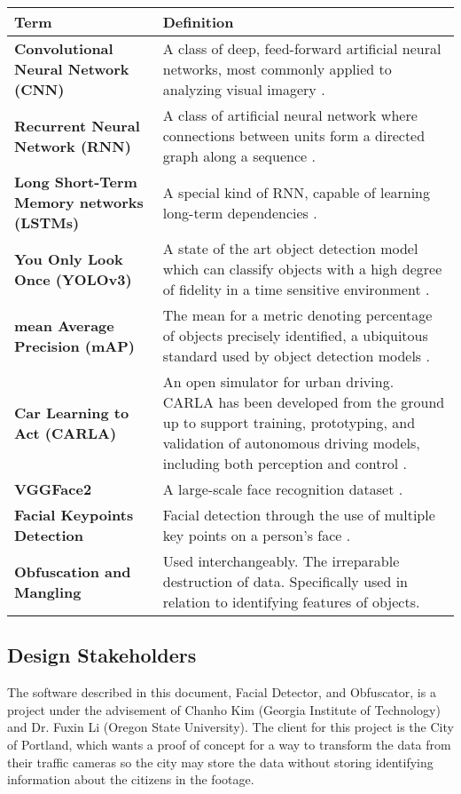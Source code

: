\begin{center}
  \begin{tabular}{ | l | p{10cm} | } 
    \hline \textbf{Term} & \textbf{Definition} \\ \hline
    \textbf{Convolutional Neural Network (CNN)} & A class of deep, feed-forward artificial neural networks, most commonly applied to analyzing visual imagery \cite{CNN}. \\ \hline
    \textbf{Recurrent Neural Network (RNN)} & A class of artificial neural network where connections between units form a directed graph along a sequence \cite{RNN}. \\ \hline
    \textbf{Long Short-Term Memory networks (LSTMs)} & A special kind of RNN, capable of learning long-term dependencies \cite{LSTMs}. \\ \hline
    \textbf{You Only Look Once (YOLOv3)} & A state of the art object detection model which can classify objects with a high degree of fidelity in a time sensitive environment \cite{YOLOv3}. \\ \hline
    \textbf{mean Average Precision (mAP)} & The mean for a metric denoting percentage of objects precisely identified, a ubiquitous standard used by object detection models \cite{YOLOv3}. \\ \hline
    \textbf{Car Learning to Act (CARLA)} & An open simulator for urban driving. CARLA has been developed from the ground up to support training, prototyping, and validation of autonomous driving models, including both perception and control \cite{Carla}. \\ \hline 
    \textbf{VGGFace2} & A large-scale face recognition dataset \cite{VGGFace2}. \\ \hline 
    \textbf{Facial Keypoints Detection} & Facial detection through the use of multiple key points on a person's face \cite{VGGFace2}. \\ \hline
    \textbf{Obfuscation and Mangling} & Used interchangeably. The irreparable destruction of data. Specifically used in relation to identifying features of objects. \\ \hline
  \end{tabular}
\end{center}

\subsection{Design Stakeholders}

The software described in this document, Facial Detector, and Obfuscator, is a project under the advisement of Chanho Kim (Georgia Institute of Technology) and Dr. Fuxin Li (Oregon State University). The client for this project is the City of Portland, which wants a proof of concept for a way to transform the data from their traffic cameras so the city may store the data without storing identifying information about the citizens in the footage.

